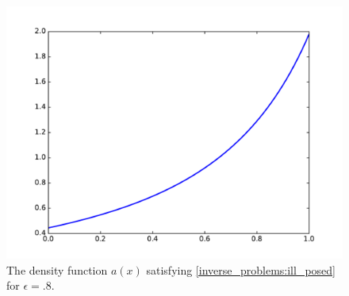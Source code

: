 \begin{figure}
\centering
\includegraphics[width=\textwidth]{ill_posed_density_a.pdf}
\caption{The density function $a(x)$ satisfying \eqref{inverse_problems:ill_posed} for $\epsilon = .8$.}
\label{fig:inverse_problems:exercise1}
\end{figure}









